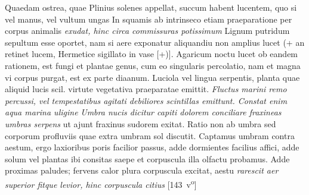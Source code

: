 Quaedam ostrea, quae Plinius\protect{} solenes appellat, succum habent lucentem, quo si vel manus, vel vultum ungas  In squamis ab intrinseco etiam praeparatione per corpus animalis\protect{} \textit{exudat, hinc circa commissuras potissimum } Lignum putridum sepultum esse oportet, nam si aere exponatur aliquandiu non amplius lucet (+ an retinet lucem, Hermetice sigillato in vase [+)]. Agaricum\protect{} noctu lucet ob eandem rationem, est fungi\protect{} et plantae genus\protect{}, cum eo singularis percolatio\protect{}, nam et magna vi corpus purgat, est ex parte diaanum. Luciola vel lingua serpentis, planta quae aliquid lucis scil. virtute vegetativa\protect{} praeparatae emittit. \textit{Fluctus marini remo percussi, vel tempestatibus agitati debiliores scintillas\protect{} emittunt. Constat enim aqua marina uligine } \textit{Umbra
nucis\protect{} dicitur capiti dolorem conciliare fraxineas umbras\protect{} serpens\protect{} } ut ajunt fraxinus sudorem exitat. Ratio non ab umbra sed corporum profluviis quae extra umbram sol discutit. Captamus umbram contra aestum, ergo laxioribus poris facilior passus, adde dormientes facilius affici, adde solum vel plantas ibi consitas saepe et corpuscula illa olfactu\protect{} probamus. Adde proximas paludes\protect{}; fervens calor plura corpuscula excitat, aestu 
\textit{rarescit aer superior fitque levior, hinc corpuscula citius }
[143~v\textsuperscript{o}]
\pend%
\count{}
\count{}
\pstart%
%
%
%
% 
